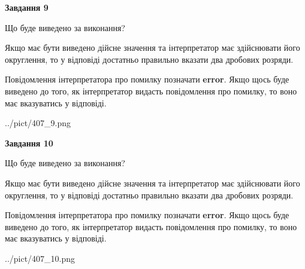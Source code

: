 \documentclass[12pt, ukrainian]{article}
\begin{document}
{\begin {Large}
{\begin {center}\textbf{Завдання 9}\end {center}}\par
Що буде виведено за виконання? \par

Якщо має бути виведено дійсне значення та інтерпретатор має здійснювати його округлення, 
то у відповіді достатньо правильно вказати два дробових розряди.

Повідомлення інтерпретатора про помилку позначати \textbf{error}.
Якщо щось буде виведено до того, як інтерпретатор видасть повідомлення про помилку, 
то воно має вказуватись у відповіді. \par

\begin{center}
	{../pict/407_9.png}
\end{center}
\newpage

{\begin {center}\textbf{Завдання 10}\end {center}}\par
Що буде виведено за виконання? \par

Якщо має бути виведено дійсне значення та інтерпретатор має здійснювати його округлення, 
то у відповіді достатньо правильно вказати два дробових розряди.

Повідомлення інтерпретатора про помилку позначати \textbf{error}.
Якщо щось буде виведено до того, як інтерпретатор видасть повідомлення про помилку, 
то воно має вказуватись у відповіді. \par

\begin{center}
	{../pict/407_10.png}
\end{center}
\newpage

\end {Large}}
\end{document}
